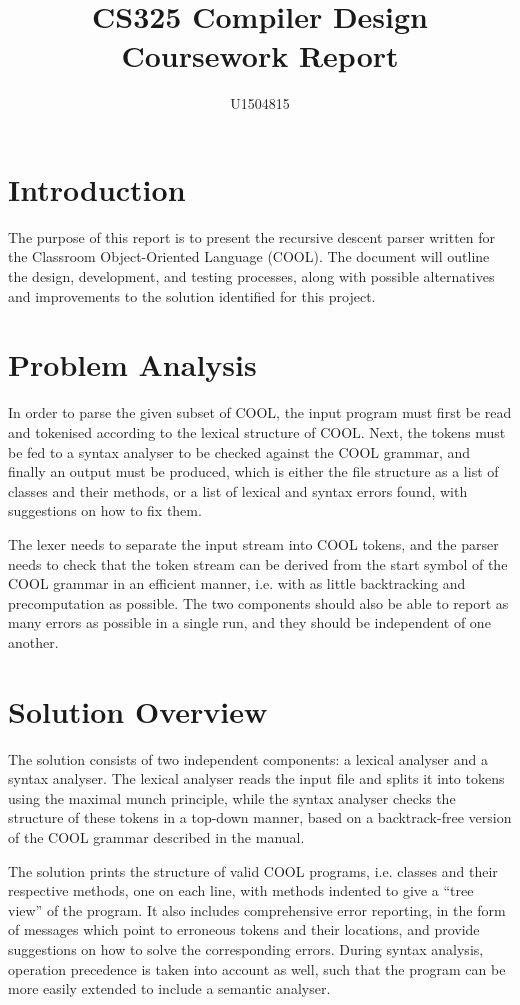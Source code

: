 \documentclass[10pt,a4paper,twocolumn]{article}
\author{U1504815}
\title{CS325 Compiler Design Coursework Report}
\begin{document}
\maketitle

\section*{Introduction}
The purpose of this report is to present the recursive descent parser written for the Classroom Object-Oriented Language (COOL). The document will outline the design, development, and testing processes, along with possible alternatives and improvements to the solution identified for this project.

\section*{Problem Analysis}
In order to parse the given subset of COOL, the input program must first be read and tokenised according to the lexical structure of COOL. Next, the tokens must be fed to a syntax analyser to be checked against the COOL grammar, and finally an output must be produced, which is either the file structure as a list of classes and their methods, or a list of lexical and syntax errors found, with suggestions on how to fix them.

The lexer needs to separate the input stream into COOL tokens, and the parser needs to check that the token stream can be derived from the start symbol of the COOL grammar in an efficient manner, i.e. with as little backtracking and precomputation as possible. The two components should also be able to report as many errors as possible in a single run, and they should be independent of one another.

\section*{Solution Overview}
The solution consists of two independent components: a lexical analyser and a syntax analyser. The lexical analyser reads the input file and splits it into tokens using the maximal munch principle, while the syntax analyser checks the structure of these tokens in a top-down manner, based on a backtrack-free version of the COOL grammar described in the manual.

The solution prints the structure of valid COOL programs, i.e. classes and their respective methods, one on each line, with methods indented to give a ``tree view'' of the program. It also includes comprehensive error reporting, in the form of messages which point to erroneous tokens and their locations, and provide suggestions on how to solve the corresponding errors. During syntax analysis, operation precedence is taken into account as well, such that the program can be more easily extended to include a semantic analyser.
\end{document}

